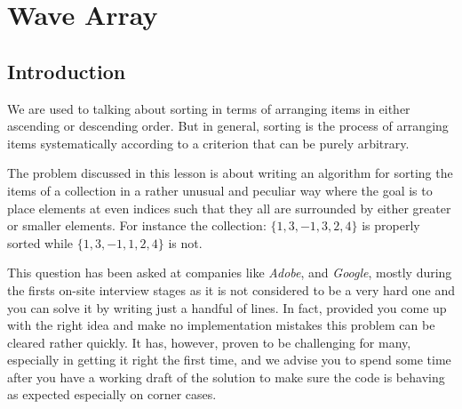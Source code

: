 %

\chapter{Wave Array}
\label{ch:wave_array}
\section*{Introduction}
We are used to talking about sorting in terms of arranging items in either ascending or descending order. But in general, sorting is the process of arranging items systematically according to a criterion that can be purely arbitrary.

The problem discussed in this lesson is about writing an algorithm for sorting the items of a collection in a rather unusual and peculiar way where the goal is to place elements at even indices such that they all are surrounded by either greater or smaller elements. For instance the collection: $\{1,3,-1,3,2,4\}$ is properly sorted while $\{1,3,-1,1,2,4\}$ is not.

This question has been asked at companies like \textit{Adobe}, and \textit{Google}, mostly during the firsts on-site interview stages as
it is not considered to be a very hard one and you can solve it by writing just a handful of lines.
In fact, provided you come up with the right idea and make no implementation mistakes this problem can be cleared rather quickly. It has, however, proven to be challenging for many, especially in getting it right the first time, and we advise you to spend some time after you have a working draft of the solution to make sure the code is behaving as expected especially on corner cases.






